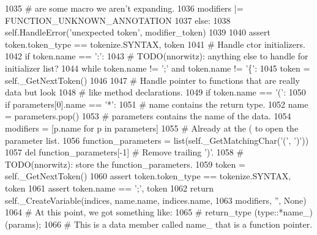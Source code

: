 \begin{DoxyCode}
1035                 \textcolor{comment}{# are some macro we aren't expanding.}
1036                 modifiers |= FUNCTION\_UNKNOWN\_ANNOTATION
1037             \textcolor{keywordflow}{else}:
1038                 self.HandleError(\textcolor{stringliteral}{'unexpected token'}, modifier\_token)
1039 
1040         \textcolor{keyword}{assert} token.token\_type == tokenize.SYNTAX, token
1041         \textcolor{comment}{# Handle ctor initializers.}
1042         \textcolor{keywordflow}{if} token.name == \textcolor{stringliteral}{':'}:
1043             \textcolor{comment}{# TODO(nnorwitz): anything else to handle for initializer list?}
1044             \textcolor{keywordflow}{while} token.name != \textcolor{stringliteral}{';'} \textcolor{keywordflow}{and} token.name != \textcolor{stringliteral}{'\{'}:
1045                 token = self.\_GetNextToken()
1046 
1047         \textcolor{comment}{# Handle pointer to functions that are really data but look}
1048         \textcolor{comment}{# like method declarations.}
1049         \textcolor{keywordflow}{if} token.name == \textcolor{stringliteral}{'('}:
1050             \textcolor{keywordflow}{if} parameters[0].name == \textcolor{stringliteral}{'*'}:
1051                 \textcolor{comment}{# name contains the return type.}
1052                 name = parameters.pop()
1053                 \textcolor{comment}{# parameters contains the name of the data.}
1054                 modifiers = [p.name \textcolor{keywordflow}{for} p \textcolor{keywordflow}{in} parameters]
1055                 \textcolor{comment}{# Already at the ( to open the parameter list.}
1056                 function\_parameters = list(self.\_GetMatchingChar(\textcolor{stringliteral}{'('}, \textcolor{stringliteral}{')'}))
1057                 del function\_parameters[-1]  \textcolor{comment}{# Remove trailing ')'.}
1058                 \textcolor{comment}{# TODO(nnorwitz): store the function\_parameters.}
1059                 token = self.\_GetNextToken()
1060                 \textcolor{keyword}{assert} token.token\_type == tokenize.SYNTAX, token
1061                 \textcolor{keyword}{assert} token.name == \textcolor{stringliteral}{';'}, token
1062                 \textcolor{keywordflow}{return} self.\_CreateVariable(indices, name.name, indices.name,
1063                                             modifiers, \textcolor{stringliteral}{''}, \textcolor{keywordtype}{None})
1064             \textcolor{comment}{# At this point, we got something like:}
1065             \textcolor{comment}{#  return\_type (type::*name\_)(params);}
1066             \textcolor{comment}{# This is a data member called name\_ that is a function pointer.}

\end{DoxyCode}
